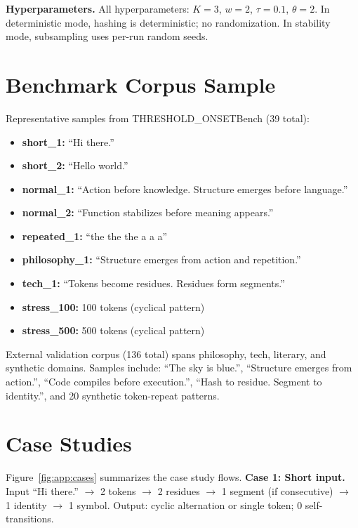 \textbf{Hyperparameters.}
All hyperparameters: $K=3$, $w=2$, $\tau=0.1$, $\theta=2$. In deterministic mode, hashing is deterministic; no randomization. In stability mode, subsampling uses per-run random seeds.

\section{Benchmark Corpus Sample}
\label{app:corpus}

Representative samples from THRESHOLD\_ONSETBench (39 total):

\begin{itemize}
\item \textbf{short\_1:} ``Hi there.''
\item \textbf{short\_2:} ``Hello world.''
\item \textbf{normal\_1:} ``Action before knowledge. Structure emerges before language.''
\item \textbf{normal\_2:} ``Function stabilizes before meaning appears.''
\item \textbf{repeated\_1:} ``the the the a a a''
\item \textbf{philosophy\_1:} ``Structure emerges from action and repetition.''
\item \textbf{tech\_1:} ``Tokens become residues. Residues form segments.''
\item \textbf{stress\_100:} 100 tokens (cyclical pattern)
\item \textbf{stress\_500:} 500 tokens (cyclical pattern)
\end{itemize}

External validation corpus (136 total) spans philosophy, tech, literary, and synthetic domains. Samples include: ``The sky is blue.'', ``Structure emerges from action.'', ``Code compiles before execution.'', ``Hash to residue. Segment to identity.'', and 20 synthetic token-repeat patterns.

\section{Case Studies}
\label{app:cases}

Figure~\ref{fig:app:cases} summarizes the case study flows. \textbf{Case 1: Short input.}
Input ``Hi there.'' $\rightarrow$ 2 tokens $\rightarrow$ 2 residues $\rightarrow$ 1 segment (if consecutive) $\rightarrow$ 1 identity $\rightarrow$ 1 symbol. Output: cyclic alternation or single token; 0 self-transitions.

